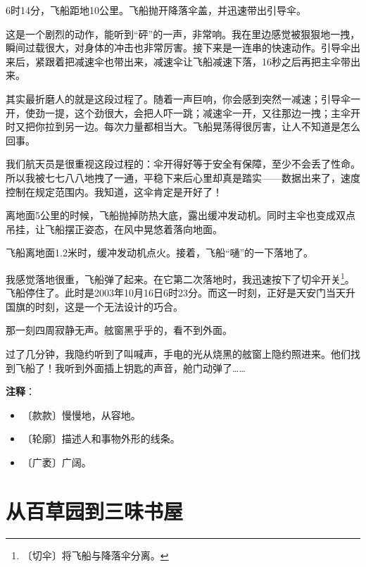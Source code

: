 \documentclass[12pt,UTF-8,openany]{ctexbook}
\begin{document}
\begin{normalsize}
    6时14分，飞船距地10公里。飞船抛开降落伞盖，并迅速带出引导伞。
    
    这是一个剧烈的动作，能听到“砰”的一声，非常响。我在里边感觉被狠狠地一拽，瞬间过载很大，对身体的冲击也非常厉害。接下来是一连串的快速动作。引导伞出来后，紧跟着把减速伞也带出来，减速伞让飞船减速下落，16秒之后再把主伞带出来。
    
    其实最折磨人的就是这段过程了。随着一声巨响，你会感到突然一减速；引导伞一开，使劲一提，这个劲很大，会把人吓一跳；减速伞一开，又往那边一拽；主伞开时又把你拉到另一边。每次力量都相当大。飞船晃荡得很厉害，让人不知道是怎么回事。
    
    我们航天员是很重视这段过程的：伞开得好等于安全有保障，至少不会丢了性命。所以我被七七八八地拽了一通，平稳下来后心里却真是踏实——数据出来了，速度控制在规定范围内。我知道，这伞肯定是开好了！
    
    离地面5公里的时候，飞船抛掉防热大底，露出缓冲发动机。同时主伞也变成双点吊挂，让飞船摆正姿态，在风中晃悠着落向地面。
    
    飞船离地面1.2米时，缓冲发动机点火。接着，飞船“嗵”的一下落地了。
    
    我感觉落地很重，飞船弹了起来。在它第二次落地时，我迅速按下了切伞开关\footnote{〔切伞〕将飞船与降落伞分离。}。飞船停住了。此时是2003年10月16日6时23分。而这一时刻，正好是天安门当天升国旗的时刻，这是一个无法设计的巧合。
    
    那一刻四周寂静无声。舷窗黑乎乎的，看不到外面。
    
    过了几分钟，我隐约听到了叫喊声，手电的光从烧黑的舷窗上隐约照进来。他们找到飞船了！我听到外面插上钥匙的声音，舱门动弹了……
    
\end{normalsize}


\newpage

\textbf{注释}：

\vspace{-1em}

\begin{itemize}
    \setlength\itemsep{-0.2em}
    \item 〔款款〕慢慢地，从容地。
    \item 〔轮廓〕描述人和事物外形的线条。
    \item 〔广袤〕广阔。
\end{itemize}

\chapter{从百草园到三味书屋}
\end{document}
